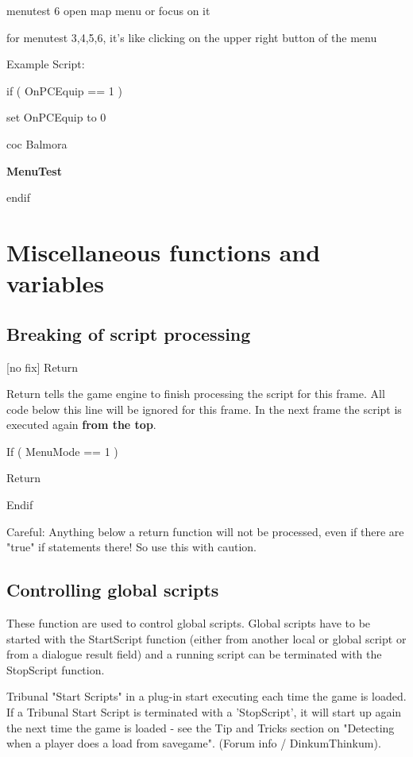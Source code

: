 \documentclass[
]{article}
\begin{document}
menutest 6 open map menu or focus on it

for menutest 3,4,5,6, it's like clicking on the upper right button of
the menu

Example Script:

if ( OnPCEquip == 1 )

set OnPCEquip to 0

coc Balmora

\textbf{MenuTest}

endif

\hypertarget{miscellaneous-functions-and-variables}{%
\section{\texorpdfstring{\hfill\break
Miscellaneous functions and
variables}{ Miscellaneous functions and variables}}\label{miscellaneous-functions-and-variables}}

\hypertarget{breaking-of-script-processing}{%
\subsection{Breaking of script
processing}\label{breaking-of-script-processing}}

{[}no fix{]} Return

Return tells the game engine to finish processing the script for this
frame. All code below this line will be ignored for this frame. In the
next frame the script is executed again \textbf{from the top}.

If ( MenuMode == 1 )

Return

Endif

Careful: Anything below a return function will not be processed, even if
there are "true" if statements there! So use this with caution.

\hypertarget{controlling-global-scripts}{%
\subsection{Controlling global
scripts}\label{controlling-global-scripts}}

These function are used to control global scripts. Global scripts have
to be started with the StartScript function (either from another local
or global script or from a dialogue result field) and a running script
can be terminated with the StopScript function.

Tribunal "Start Scripts" in a plug-in start executing each time the game
is loaded. If a Tribunal Start Script is terminated with a 'StopScript',
it will start up again the next time the game is loaded - see the Tip
and Tricks section on "Detecting when a player does a load from
savegame". (Forum info / DinkumThinkum).
\end{document}
